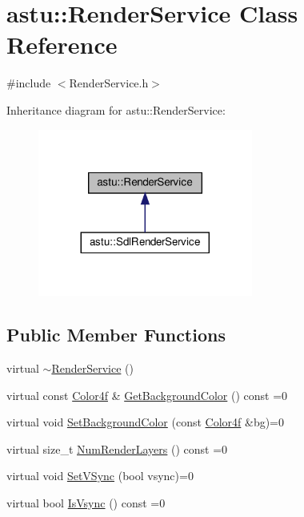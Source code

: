 \hypertarget{classastu_1_1RenderService}{}\section{astu\+:\+:Render\+Service Class Reference}
\label{classastu_1_1RenderService}


{\ttfamily \#include $<$Render\+Service.\+h$>$}



Inheritance diagram for astu\+:\+:Render\+Service\+:\nopagebreak
\begin{figure}[H]
\begin{center}
\leavevmode
\includegraphics[width=200pt]{classastu_1_1RenderService__inherit__graph}
\end{center}
\end{figure}
\subsection*{Public Member Functions}
\begin{DoxyCompactItemize}
\item 
virtual \hyperlink{classastu_1_1RenderService_a76df2f3da25b9df58a6f4d93ae2720e5}{$\sim$\+Render\+Service} ()
\item 
virtual const \hyperlink{classastu_1_1Color}{Color4f} \& \hyperlink{classastu_1_1RenderService_a5491abad694b7d662f67b4d4bc858e87}{Get\+Background\+Color} () const =0
\item 
virtual void \hyperlink{classastu_1_1RenderService_acae1a271e76761320a95d5664ce5b134}{Set\+Background\+Color} (const \hyperlink{classastu_1_1Color}{Color4f} \&bg)=0
\item 
virtual size\+\_\+t \hyperlink{classastu_1_1RenderService_a2347b2ac2b5f57b79bad63de9b8e6841}{Num\+Render\+Layers} () const =0
\item 
virtual void \hyperlink{classastu_1_1RenderService_af13a90300b42075e26c998d19332eff6}{Set\+V\+Sync} (bool vsync)=0
\item 
virtual bool \hyperlink{classastu_1_1RenderService_a63ee728bf462dcd71821b2104a1d631a}{Is\+Vsync} () const =0
\end{DoxyCompactItemize}


